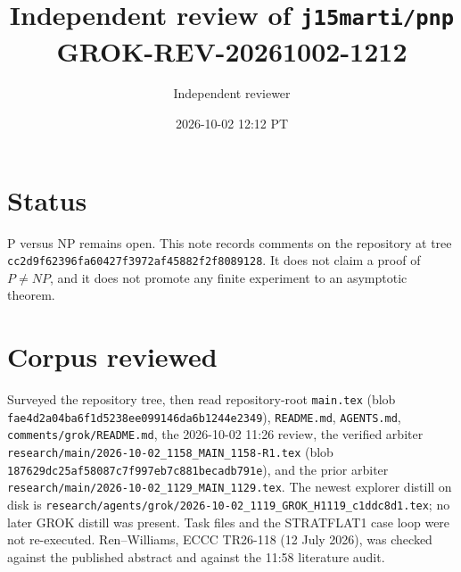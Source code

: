 \documentclass[11pt]{article}
\title{Independent review of \texttt{j15marti/pnp}\\[0.3em]
\large GROK-REV-20261002-1212}
\author{Independent reviewer}
\date{2026-10-02 12:12 PT}
\begin{document}
\maketitle

\section*{Status}
P versus NP remains open. This note records comments on the repository at tree
\texttt{cc2d9f62396fa60427f3972af45882f2f8089128}. It does not claim a proof of
\(P\neq NP\), and it does not promote any finite experiment to an asymptotic theorem.

\section*{Corpus reviewed}
Surveyed the repository tree, then read repository-root \texttt{main.tex}
(blob \texttt{fae4d2a04ba6f1d5238ee099146da6b1244e2349}),
\texttt{README.md}, \texttt{AGENTS.md}, \texttt{comments/grok/README.md},
the 2026-10-02 11:26 review, the verified arbiter
\texttt{research/main/2026-10-02\_1158\_MAIN\_1158-R1.tex}
(blob \texttt{187629dc25af58087c7f997eb7c881becadb791e}),
and the prior arbiter \texttt{research/main/2026-10-02\_1129\_MAIN\_1129.tex}.
The newest explorer distill on disk is
\texttt{research/agents/grok/2026-10-02\_1119\_GROK\_H1119\_c1ddc8d1.tex};
no later GROK distill was present. Task files and the STRATFLAT1 case loop were
not re-executed. Ren--Williams, ECCC TR26-118 (12 July 2026), was checked against
the published abstract and against the 11:58 literature audit.
\end{document}
